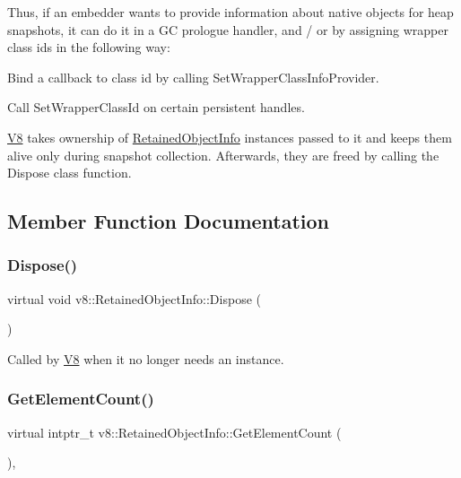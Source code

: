 Thus, if an embedder wants to provide information about native objects for heap snapshots, it can do it in a GC prologue handler, and / or by assigning wrapper class ids in the following way\+:


\begin{DoxyEnumerate}
\item Bind a callback to class id by calling Set\+Wrapper\+Class\+Info\+Provider.
\item Call Set\+Wrapper\+Class\+Id on certain persistent handles.
\end{DoxyEnumerate}

\mbox{\hyperlink{classv8_1_1V8}{V8}} takes ownership of \mbox{\hyperlink{classv8_1_1RetainedObjectInfo}{Retained\+Object\+Info}} instances passed to it and keeps them alive only during snapshot collection. Afterwards, they are freed by calling the Dispose class function. 

\subsection{Member Function Documentation}
\mbox{\label{classv8_1_1RetainedObjectInfo_a5011203f7c5949049ba36b8059f03eca}} 
\subsubsection{\texorpdfstring{Dispose()}{Dispose()}}
{\footnotesize\ttfamily virtual void v8\+::\+Retained\+Object\+Info\+::\+Dispose (\begin{DoxyParamCaption}{ }\end{DoxyParamCaption})\hspace{0.3cm}{\ttfamily [pure virtual]}}

Called by \mbox{\hyperlink{classv8_1_1V8}{V8}} when it no longer needs an instance. \mbox{\label{classv8_1_1RetainedObjectInfo_ae6865597469bc7d28bd8ec71b4b890bd}} 
\subsubsection{\texorpdfstring{Get\+Element\+Count()}{GetElementCount()}}
{\footnotesize\ttfamily virtual intptr\+\_\+t v8\+::\+Retained\+Object\+Info\+::\+Get\+Element\+Count (\begin{DoxyParamCaption}{ }\end{DoxyParamCaption})\hspace{0.3cm}{\ttfamily [inline]}, {\ttfamily [virtual]}}

